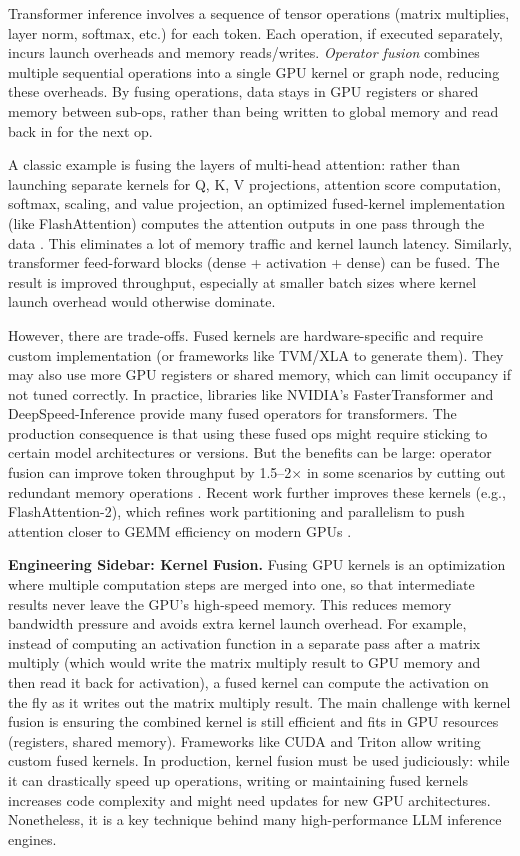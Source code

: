 Transformer inference involves a sequence of tensor operations (matrix multiplies, layer norm, softmax, etc.) for each token. Each operation, if executed separately, incurs launch overheads and memory reads/writes. \textit{Operator fusion} combines multiple sequential operations into a single GPU kernel or graph node, reducing these overheads. By fusing operations, data stays in GPU registers or shared memory between sub-ops, rather than being written to global memory and read back in for the next op.

A classic example is fusing the layers of multi-head attention: rather than launching separate kernels for Q, K, V projections, attention score computation, softmax, scaling, and value projection, an optimized fused-kernel implementation (like FlashAttention) computes the attention outputs in one pass through the data \cite{Dao2022FlashAttention}. This eliminates a lot of memory traffic and kernel launch latency. Similarly, transformer feed-forward blocks (dense + activation + dense) can be fused. The result is improved throughput, especially at smaller batch sizes where kernel launch overhead would otherwise dominate.

However, there are trade-offs. Fused kernels are hardware-specific and require custom implementation (or frameworks like TVM/XLA to generate them). They may also use more GPU registers or shared memory, which can limit occupancy if not tuned correctly. In practice, libraries like NVIDIA’s FasterTransformer and DeepSpeed-Inference provide many fused operators for transformers. The production consequence is that using these fused ops might require sticking to certain model architectures or versions. But the benefits can be large: operator fusion can improve token throughput by 1.5--2$\times$ in some scenarios by cutting out redundant memory operations \cite{NVIDIA2023Hopper,Dao2022FlashAttention}. Recent work further improves these kernels (e.g., FlashAttention-2), which refines work partitioning and parallelism to push attention closer to GEMM efficiency on modern GPUs \cite{Dao2023FlashAttention2}.

\noindent \textbf{Engineering Sidebar: Kernel Fusion.} Fusing GPU kernels is an optimization where multiple computation steps are merged into one, so that intermediate results never leave the GPU’s high-speed memory. This reduces memory bandwidth pressure and avoids extra kernel launch overhead. For example, instead of computing an activation function in a separate pass after a matrix multiply (which would write the matrix multiply result to GPU memory and then read it back for activation), a fused kernel can compute the activation on the fly as it writes out the matrix multiply result. The main challenge with kernel fusion is ensuring the combined kernel is still efficient and fits in GPU resources (registers, shared memory). Frameworks like CUDA and Triton allow writing custom fused kernels. In production, kernel fusion must be used judiciously: while it can drastically speed up operations, writing or maintaining fused kernels increases code complexity and might need updates for new GPU architectures. Nonetheless, it is a key technique behind many high-performance LLM inference engines.

